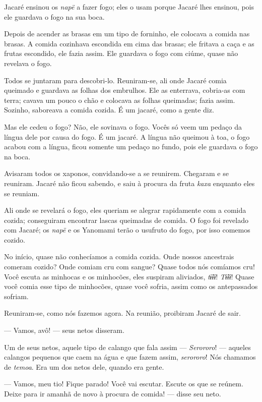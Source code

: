 Jacaré ensinou os \textit{napë} a fazer fogo; eles o usam porque Jacaré
lhes ensinou, pois ele guardava o fogo na sua boca.

Depois de acender as brasas em um tipo de forninho, ele colocava a
comida nas brasas. A comida cozinhava escondida em cima das brasas; ele
fritava a caça e as frutas escondido, ele fazia assim. Ele
guardava o fogo com ciúme, quase não revelava o fogo. 

Todos se juntaram para descobri-lo. Reuniram-se, ali onde Jacaré comia
queimado e guardava as folhas dos embrulhos. Ele as enterrava, cobria-as
com terra; cavava um pouco o chão e colocava as folhas queimadas; fazia assim. Sozinho, saboreava a comida cozida. É um jacaré, como a gente
diz.

Mas ele cedeu o fogo? Não, ele sovinava o fogo. Vocês só veem um pedaço
da língua dele por causa do fogo. É um jacaré. A língua não queimou à
toa, o fogo acabou com a língua, ficou somente um pedaço no fundo, pois
ele guardava o fogo na boca. 

Avisaram todos os xaponos, convidando-se a se reunirem. Chegaram e se
reuniram. Jacaré não ficou sabendo, e saiu à procura da
fruta \textit{kaxa} enquanto eles se reuniam. 

Ali onde se revelará o fogo, eles queriam se alegrar rapidamente com a comida
cozida; conseguiram encontrar lascas queimadas de comida. O fogo foi revelado com Jacaré; os \textit{napë} e os Yanomami terão o usufruto do fogo,
por isso comemos cozido.

No início, quase não conhecíamos a comida cozida. Onde nossos ancestrais
comeram cozido? Onde comiam cru com sangue? Quase todos nós comíamos
cru! Você escuta as minhocas e os minhocões, eles suspiram
aliviados, \textit{tɨ̃ɨɨ}! \textit{Tɨ̃ɨɨ}! Quase você comia esse tipo de
minhocões, quase você sofria, assim como os antepassados sofriam. 

Reuniram-se, como nós fazemos agora. Na reunião, proibiram Jacaré de sair. 

--- Vamos, avô! --- seus netos disseram. 

Um de seus netos, aquele tipo de calango que fala
assim --- \textit{Serororo}! --- aqueles calangos pequenos que caem na água e
que fazem assim, \textit{serororo}! Nós chamamos de \textit{temoa}. Era um
dos netos dele, quando era gente. 

--- Vamos, meu tio! Fique parado! Você vai escutar. Escute os que se
reúnem. Deixe para ir amanhã de novo à procura de comida! --- disse seu
neto. 

